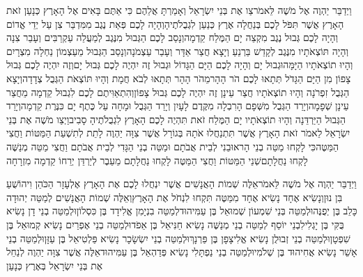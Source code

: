 \documentclass[../main/main.tex]{subfiles}
\begin{document}
\begin{multicols*}{\ncols}
וַיְדַבֵּר יַהְוֶה אֶל מֹשֶׁה לֵּאמֹר\PreVerseSpace{}צַו אֶת בְּנֵי יִשְׂרָאֵל וְאָמַרְתָּ אֲלֵהֶם כִּי אַתֶּם בָּאִים אֶל הָאָרֶץ כְּנָעַן זֹאת הָאָרֶץ אֲשֶׁר תִּפֹּל לָכֶם בְּנַחֲלָה אֶרֶץ כְּנַעַן לִגְבֻלֹתֶיהָ\PreVerseSpace{}וְהָיָה לָכֶם פְּאַת נֶגֶב מִמִּדְבַּר צִן עַל יְדֵי אֱדוֹם וְהָיָה לָכֶם גְּבוּל נֶגֶב מִקְצֵה יָם הַמֶּלַח קֵדְמָה\PreVerseSpace{}וְנָסַב לָכֶם הַגְּבוּל מִנֶּגֶב לְמַעֲלֵה עַקְרַבִּים וְעָבַר צִנָה וְהָיָה תּוֹצְאֹתָיו מִנֶּגֶב לְקָדֵשׁ בַּרְנֵעַ וְיָצָא חֲצַר אַדָּר וְעָבַר עַצְמֹנָה\PreVerseSpace{}וְנָסַב הַגְּבוּל מֵעַצְמוֹן נַחְלָה מִצְרָיִם וְהָיוּ תוֹצְאֹתָיו הַיָּמָּה\PreVerseSpace{}וּגְבוּל יָם וְהָיָה לָכֶם הַיָּם הַגָּדוֹל וּגְבוּל זֶה יִהְיֶה לָכֶם גְּבוּל יָם\PreVerseSpace{}וְזֶה יִהְיֶה לָכֶם גְּבוּל צָפוֹן מִן הַיָּם הַגָּדֹל תְּתָאוּ לָכֶם הֹר הָהָר\PreVerseSpace{}מֵהֹר הָהָר תְּתָאוּ לְבֹא חֲמָת וְהָיוּ תּוֹצְאֹת הַגְּבֻל צְדָדָה\PreVerseSpace{}וְיָצָא הַגְּבֻל זִפְרֹנָה וְהָיוּ תוֹצְאֹתָיו חֲצַר עֵינָן זֶה יִהְיֶה לָכֶם גְּבוּל צָפוֹן\PreVerseSpace{}וְהִתְאַוִּיתֶם לָכֶם לִגְבוּל קֵדְמָה מֵחֲצַר עֵינָן שְׁפָמָה\PreVerseSpace{}וְיָרַד הַגְּבֻל מִשְּׁפָם הָרִבְלָה מִקֶּדֶם לָעָיִן וְיָרַד הַגְּבֻל וּמָחָה עַל כֶּתֶף יָם כִּנֶּרֶת קֵדְמָה\PreVerseSpace{}וְיָרַד הַגְּבוּל הַיַּרְדֵּנָה וְהָיוּ תוֹצְאֹתָיו יָם הַמֶּלַח זֹאת תִּהְיֶה לָכֶם הָאָרֶץ לִגְבֻלֹתֶיהָ סָבִיב\PreVerseSpace{}וַיְצַו מֹשֶׁה אֶת בְּנֵי יִשְׂרָאֵל לֵאמֹר זֹאת הָאָרֶץ אֲשֶׁר תִּתְנַחֲלוּ אֹתָהּ בְּגוֹרָל אֲשֶׁר צִוָּה יַהְוֶה לָתֵת לְתִשְׁעַת הַמַּטּוֹת וַחֲצִי הַמַּטֶּה\PreVerseSpace{}כִּי לָקְחוּ מַטֵּה בְנֵי הָראוּבֵנִי לְבֵית אֲבֹתָם וּמַטֵּה בְנֵי הַגָּדִי לְבֵית אֲבֹתָם וַחֲצִי מַטֵּה מְנַשֶּׁה לָקְחוּ נַחֲלָתָם\PreVerseSpace{}שְׁנֵי הַמַּטּוֹת וַחֲצִי הַמַּטֶּה לָקְחוּ נַחֲלָתָם מֵעֵבֶר לְיַרְדֵּן יְרֵחוֹ קֵדְמָה מִזְרָחָה\OpenSection{}\par
{}וַיְדַבֵּר יַהְוֶה אֶל מֹשֶׁה לֵּאמֹר\PreVerseSpace{}אֵלֶּה שְׁמוֹת הָאֲנָשִׁים אֲשֶׁר יִנְחֲלוּ לָכֶם אֶת הָאָרֶץ אֶלְעָזָר הַכֹּהֵן וִיהוֹשֻׁעַ בִּן נוּן\PreVerseSpace{}וְנָשִׂיא אֶחָד נָשִׂיא אֶחָד מִמַּטֶּה תִּקְחוּ לִנְחֹל אֶת הָאָרֶץ\PreVerseSpace{}וְאֵלֶּה שְׁמוֹת הָאֲנָשִׁים לְמַטֵּה יְהוּדָה כָּלֵב בֶּן יְפֻנֶּה\PreVerseSpace{}וּלְמַטֵּה בְּנֵי שִׁמְעוֹן שְׁמוּאֵל בֶּן עַמִּיהוּד\PreVerseSpace{}לְמַטֵּה בִנְיָמִן אֱלִידָד בֶּן כִּסְלוֹן\PreVerseSpace{}וּלְמַטֵּה בְנֵי דָן נָשִׂיא בֻּקִּי בֶּן יָגְלִי\PreVerseSpace{}לִבְנֵי יוֹסֵף לְמַטֵּה בְנֵי מְנַשֶּׁה נָשִׂיא חַנִּיאֵל בֶּן אֵפֹד\PreVerseSpace{}וּלְמַטֵּה בְנֵי אֶפְרַיִם נָשִׂיא קְמוּאֵל בֶּן שִׁפְטָן\PreVerseSpace{}וּלְמַטֵּה בְנֵי זְבוּלֻן נָשִׂיא אֱלִיצָפָן בֶּן פַּרְנָךְ\PreVerseSpace{}וּלְמַטֵּה בְנֵי יִשְׂשָׂכָר נָשִׂיא פַּלְטִיאֵל בֶּן עַזָּן\PreVerseSpace{}וּלְמַטֵּה בְנֵי אָשֵׁר נָשִׂיא אֲחִיהוּד בֶּן שְׁלֹמִי\PreVerseSpace{}וּלְמַטֵּה בְנֵי נַפְתָּלִי נָשִׂיא פְּדַהְאֵל בֶּן עַמִּיהוּד\PreVerseSpace{}אֵלֶּה אֲשֶׁר צִוָּה יַהְוֶה לְנַחֵל אֶת בְּנֵי יִשְׂרָאֵל בְּאֶרֶץ כְּנָעַן\OpenSection{}\par

\end{multicols*}
\end{document}
